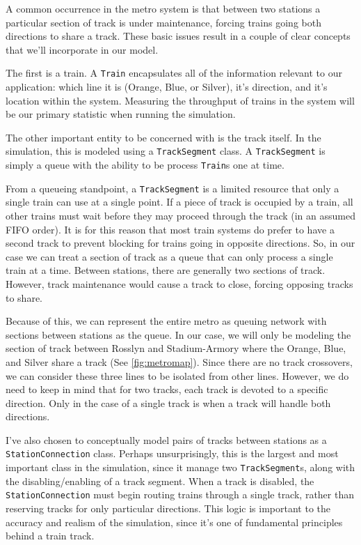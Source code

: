 \documentclass[a4paper,12pt]{article}
\begin{document}
A common occurrence in the metro system is that between two stations a particular section of track is under
maintenance, forcing trains going both directions to share a track. These basic issues result in a couple of clear
concepts that we'll incorporate in our model.

The first is a train. A \texttt{Train} encapsulates all of the information relevant to our application: which line it is
(Orange, Blue, or Silver), it's direction, and it's location within the system. Measuring the throughput of trains
in the system will be our primary statistic when running the simulation.

The other important entity to be concerned with is the track itself. In the simulation, this is modeled using a
\texttt{TrackSegment} class. A \texttt{TrackSegment} is simply a queue with the ability to be process \texttt{Train}s
one at time.

From a queueing standpoint, a \texttt{TrackSegment} is a limited
resource that only a single train can use at a single point. If a piece of track is occupied by a train, all other
trains must wait before they may proceed through the track (in an assumed FIFO order). It is for this reason that
most train systems do prefer to have a second track to prevent blocking for trains going in opposite directions.
So, in our case we can treat a section of track as a queue that can only process a single train at a time. Between
stations, there are generally two sections of track. However, track maintenance would cause a track to close, forcing
opposing tracks to share.

Because of this, we can represent the entire metro as queuing network with sections between stations as the queue. In
our case, we will only be modeling the section of track between Rosslyn and Stadium-Armory where the Orange, Blue, and
Silver share a track (See \ref{fig:metromap}). Since there are no track crossovers, we can consider these three lines
to be isolated from other lines. However, we do need to keep in mind that for two tracks, each track is devoted to a
specific direction. Only in the case of a single track is when a track will handle both directions.

I've also chosen to conceptually model pairs of tracks between stations as a \texttt{StationConnection} class. Perhaps
unsurprisingly, this is the largest and most important class in the simulation, since it manage two
\texttt{TrackSegment}s, along with the disabling/enabling of a track segment. When a track is disabled, the
\texttt{StationConnection} must begin routing trains through a single track, rather than reserving tracks for
only particular directions. This logic is important to the accuracy and realism of the simulation, since it's one of
fundamental principles behind a train track. 
\end{document}
